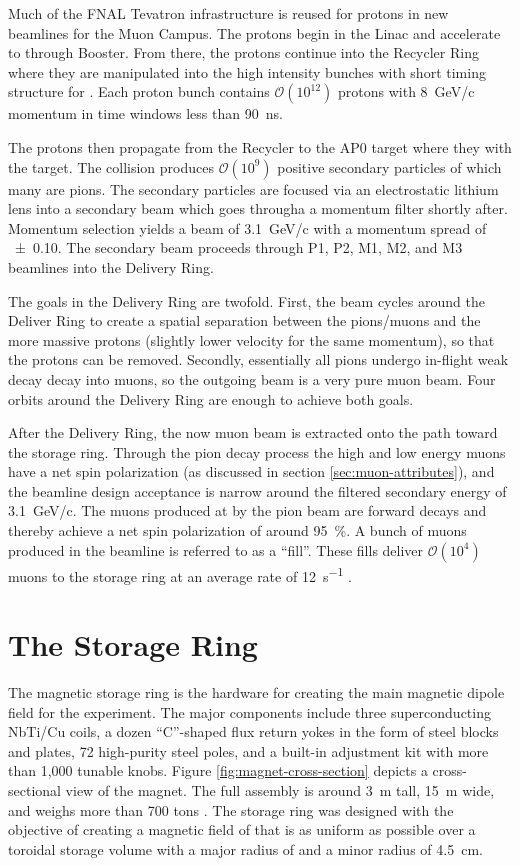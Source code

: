 Much of the FNAL Tevatron infrastructure is reused for protons in new beamlines for the Muon Campus.  The protons begin in the Linac and accelerate to through Booster.  From there, the protons continue into the Recycler Ring where they are manipulated into the high intensity bunches with short timing structure for \gmtwo.  Each proton bunch contains $\mathcal{O}(10^{12})$ protons with \SI{8}{\GeV/c} momentum in time windows less than \SI{90}{\nano \second}.

The protons then propagate from the Recycler to the AP0 target where they with the target.  The collision produces $\mathcal{O}(10^9)$ positive secondary particles of which many are pions.  The secondary particles are focused via an electrostatic lithium lens into a secondary beam which goes througha a momentum filter shortly after.  Momentum selection yields a beam of \SI{3.1}{\GeV/c} with a momentum spread of \SI{\pm 0.10}{}.  The secondary beam proceeds through P1, P2, M1, M2, and M3 beamlines into the Delivery Ring.  

The goals in the Delivery Ring are twofold.  First, the beam cycles around the Deliver Ring to create a spatial separation between the pions/muons and the more massive protons (slightly lower velocity for the same momentum), so that the protons can be removed.  Secondly, essentially all pions undergo in-flight weak decay decay into muons, so the outgoing beam is a very pure muon beam.  Four orbits around the Delivery Ring are enough to achieve both goals.

After the Delivery Ring, the now muon beam is extracted onto the path toward the \mugmtwo storage ring. Through the pion decay process the high and low energy muons have a net spin polarization (as discussed in section \ref{sec:muon-attributes}), and the beamline design acceptance is narrow around the filtered secondary energy of \SI{3.1}{\GeV/c}.  The muons produced at \pmagic by the pion beam are forward decays and thereby achieve a net spin polarization of around \SI{95}{\percent}.  A bunch of muons produced in the beamline is referred to as a ``fill''. These fills deliver $\mathcal{O}(10^{4})$ muons to the storage ring at an average rate of \SI{12}{\second^{-1}} \cite{e989-tdr}.

\section{The Storage Ring} \label{sec:storage-ring}
The magnetic storage ring is the hardware for creating the main magnetic dipole field for the experiment.  The major components include three superconducting NbTi/Cu coils, a dozen ``C''-shaped flux return yokes in the form of steel blocks and plates, 72 high-purity steel poles, and a built-in adjustment kit with more than 1,000 tunable knobs.  Figure \ref{fig:magnet-cross-section} depicts a cross-sectional view of the magnet.  The full assembly is around \SI{3}{\meter} tall, \SI{15}{\meter} wide, and weighs more than 700 tons \cite{e989-tdr}.  The storage ring was designed with the objective of creating a magnetic field of \bmagic that is as uniform as possible over a toroidal storage volume with a major radius of \rmagic and a minor radius of \SI{4.5}{\cm}.

